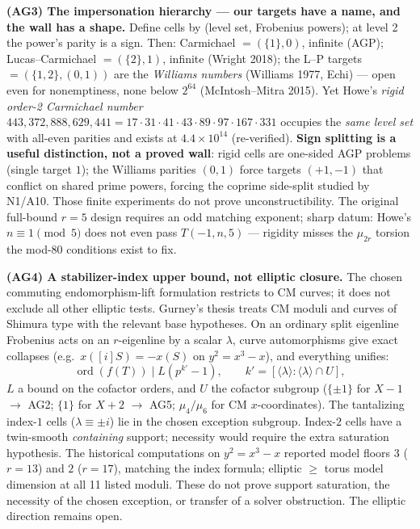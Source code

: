 \documentclass[10pt]{article}
\DeclareMathOperator{\ord}{ord}
\begin{document}
\textbf{(AG3) The impersonation hierarchy --- our targets have a name, and
the wall has a shape.} Define cells by (level set, Frobenius powers); at
level 2 the power's parity is a sign. Then: Carmichael $= (\{1\}, 0)$,
infinite (AGP); Lucas--Carmichael $= (\{2\}, 1)$, infinite (Wright 2018);
the L--P targets $= (\{1,2\}, (0,1))$ are the \emph{Williams numbers}
(Williams 1977, Echi) --- open even for nonemptiness, none below $2^{64}$
(McIntosh--Mitra 2015). Yet Howe's \emph{rigid order-2 Carmichael number}
$443{,}372{,}888{,}629{,}441 = 17{\cdot}31{\cdot}41{\cdot}43{\cdot}89
{\cdot}97{\cdot}167{\cdot}331$ occupies the \emph{same level set} with
all-even parities and exists at $4.4 \times 10^{14}$ (re-verified).
\textbf{Sign splitting is a useful distinction, not a proved wall}: rigid cells are one-sided
AGP problems (single target $1$); the Williams parities $(0,1)$ force
targets $(+1, -1)$ that conflict on shared prime powers, forcing the
coprime side-split studied by N1/A10. Those finite experiments do not prove
unconstructibility. The original full-bound $r=5$ design requires an odd
matching exponent; sharp datum: Howe's $n \equiv 1 \pmod 5$ does not
even pass $T(-1,n,5)$ --- rigidity misses the $\mu_{2r}$ torsion the
mod-80 conditions exist to fix.

\textbf{(AG4) A stabilizer-index upper bound, not elliptic closure.}
The chosen commuting endomorphism-lift formulation restricts to CM curves;
it does not exclude all other elliptic tests. Gurney's thesis treats CM
moduli and curves of Shimura type with the relevant base hypotheses.
On an ordinary split eigenline Frobenius
acts on an $r$-eigenline by a scalar $\lambda$, curve automorphisms give
exact collapses (e.g.\ $x([i]S) = -x(S)$ on $y^2 = x^3 - x$), and
everything unifies:
\[
\ord(f(T))\mid L(p^{k'}-1),\qquad
k'=[\langle\lambda\rangle:\langle\lambda\rangle\cap U],
\]
$L$ a bound on the cofactor orders, and $U$ the cofactor subgroup
($\{\pm1\}$ for $X{-}1$ $\to$ AG2;
$\{1\}$ for $X{+}2$ $\to$ AG5; $\mu_4/\mu_6$ for CM $x$-coordinates). The
tantalizing index-$1$ cells ($\lambda\equiv\pm i$) lie in the chosen
exception subgroup. Index-$2$ cells have a twin-smooth \emph{containing}
support; necessity would require the extra saturation hypothesis.
The historical computations on
$y^2=x^3-x$ reported model floors $3$ ($r=13$) and $2$ ($r=17$),
matching the index formula; elliptic $\ge$ torus model dimension at all 11 listed moduli.
These do not prove support saturation, the necessity of the chosen exception,
or transfer of a solver obstruction. The elliptic direction remains open.
\end{document}

